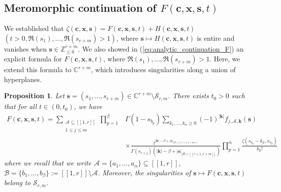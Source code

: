 \documentclass[a4paper]{amsart}
\newtheorem{proposition}[theorem]{Proposition}
\theoremstyle{remark}
\theoremstyle{definition}
\begin{document}
\subsection{Meromorphic continuation of \texorpdfstring{$F(\mathbf{c},\mathbf{x},\mathbf{s},t)$}{analyticcontinuationF}}
\label{subsection:analytic_continuation_F}

We established that $\zeta(\mathbf{c},\mathbf{x},\mathbf{s}) = F(\mathbf{c},\mathbf{x},\mathbf{s},t)+H(\mathbf{c},\mathbf{x},\mathbf{s},t)$ $(t>0,\Re(s_1),\ldots,\Re(s_{r+m})>1)$, where $\mathbf{s}\mapsto H(\mathbf{c},\mathbf{x},\mathbf{s},t)$ is entire and vanishes when $\mathbf{s} \in \mathbb{Z}_{\leq 0}^{r+m}$. We also showed in (\ref{eq:analytic_continuation_F}) an explicit formula for $F(\mathbf{c},\mathbf{x},\mathbf{s},t)$, where $\Re(s_1),\ldots,\Re(s_{r+m})>1$. Here, we extend this formula to $\mathbb{C}^{r+m}$, which introduces singularities along a union of hyperplanes.

\begin{proposition}
\label{prop:analytic_continuation_F_bis}
Let $\mathbf{s}=(s_1,\ldots,s_{r+m}) \in \mathbb{C}^{r+m} \setminus \mathcal{S}_{r,m}$. There exists $t_0>0$ such that for all $t \in (0,t_0)$, we have
\begin{align}
    F(\mathbf{c},\mathbf{x},\mathbf{s},t) = \sum_{\substack{\mathcal{A} \subseteq [\![1,r]\!] \\ 1 \leq j \leq m}} \prod_{p=1}^{\beta}& \Gamma(1-s_{b_p}) \sum_{k_1,\ldots,k_{\alpha}\geq 0} (-1)^{|\mathbf{k}|} f_{j,\mathcal{A},\mathbf{k}}(\mathbf{s}) \label{eq:analytic_continuation_F_bis} \\
    & \times \frac{t^{|\mathbf{k}|-\beta+|\mathbf{s}|_{|\mathcal{B}\cup [\![ r+1,r+m ]\!]}}}{\Gamma(s_{r+j})(|\mathbf{k}|-\beta+|\mathbf{s}|_{|\mathcal{B}\cup [\![ r+1,r+m ]\!]})} \prod_{p=1}^{\alpha} \frac{\zeta(s_{a_p}-k_p,x_{a_p})}{k_p!} \nonumber
\end{align}
where we recall that we write $\mathcal{A}=\{ a_1,\ldots,a_{\alpha}\} \subseteq [\![ 1,r ]\!]$, $\mathcal{B}=\{ b_1,\ldots,b_{\beta}\} := [\![ 1,r ]\!] \setminus \mathcal{A}$. Moreover, the singularities of $\mathbf{s} \mapsto F(\mathbf{c},\mathbf{x},\mathbf{s},t)$ belong to $\mathcal{S}_{r,m}$.
\end{proposition}
\end{document}
